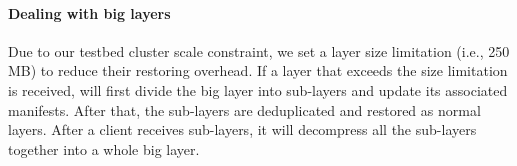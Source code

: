 \paragraph{Dealing with big layers}
Due to our testbed cluster scale constraint,
we set a layer size limitation (i.e., 250 MB) to reduce their restoring overhead.
If a layer that exceeds the size limitation is received,
\sysname will first divide the big layer into sub-layers and update its associated manifests.
After that,
the sub-layers are deduplicated and restored as normal layers.
After a client receives sub-layers,   
it will decompress all the sub-layers together into a whole big layer.
%
%
%

